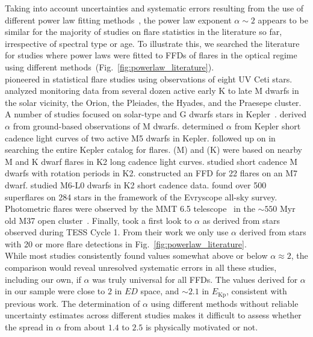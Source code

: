 \documentclass{aa}
\begin{document}
Taking into account uncertainties and systematic errors resulting from the use of different power law fitting methods~\citep{maschberger2009}, the power law exponent $\alpha\sim 2$ appears to be similar for the majority of studies on flare statistics in the literature so far, irrespective of spectral type or age. To illustrate this, we searched the literature for studies where power laws were fitted to FFDs of flares in the optical regime using different methods~(Fig.~\ref{fig:powerlaw_literature}). 
\\
 \citet{lacy_uv_1976} pioneered in statistical flare studies using observations of eight UV Ceti stars. \citet{shakhovskaya_stellar_1989} analyzed monitoring data from several dozen active early K to late M dwarfs in the solar vicinity, the Orion, the Pleiades, the Hyades, and the Praesepe cluster. A number of studies focused on solar-type and G dwarfs stars in Kepler~\citep{shibayama2013,wu2015}. \citet{hilton2011} derived $\alpha$ from ground-based observations of M dwarfs. \citet{lurie2015} determined $\alpha$ from Kepler short cadence light curves of two active M5 dwarfs in Kepler. %
       \citet{yang_flaring_2017} followed up on \citet{davenport_kepler_2016} in searching the entire Kepler catalog for flares. \citet{lin2019} (M) and (K) were based on nearby M and K dwarf flares in K2 long cadence light curves. \citep{raetz2020} studied short cadence M dwarfs with rotation periods in K2. \citet{gizis_k2_2017-1} constructed an FFD for 22 flares on an M7 dwarf. \citet{paudel2018} studied M6-L0 dwarfs in K2 short cadence data. \citet{howard2019} found over 500 superflares on 284 stars in the framework of the Evryscope all-sky survey. Photometric flares were observed by the MMT 6.5 telescope~\citep{hartman2008} in the $\sim550$ Myr old M37 open cluster~\citep{chang2015}. Finally, \citep{guenther2020} took a first look to $\alpha$ as derived from stars observed during TESS Cycle 1. From their work we only use $\alpha$ derived from stars with 20 or more flare detections in Fig.~\ref{fig:powerlaw_literature}.
       \\
While most studies consistently found values somewhat above or below $\alpha\approx2$, the comparison would reveal unresolved systematic errors in all these studies, including our own, if $\alpha$ was truly universal for all FFDs. The values derived for $\alpha$ in our sample were close to $2$ in $ED$ space, and $\sim 2.1$ in $E_\mathrm{Kp}$, consistent with previous work. The determination of $\alpha$ using different methods without reliable uncertainty estimates across different studies makes it difficult to assess whether the spread in $\alpha$ from about $1.4$ to $2.5$ is physically motivated or not. 
\end{document}
